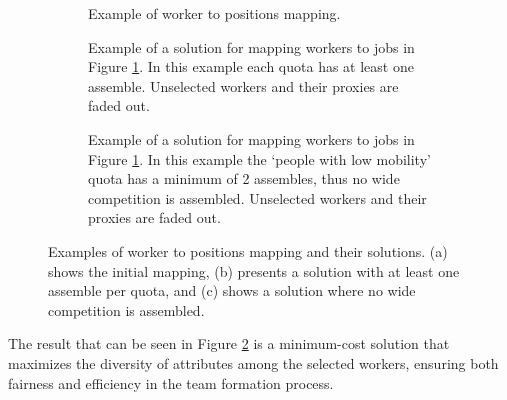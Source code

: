         \begin{figure}[]
            \centering
            \begin{subfigure}[t]{0.8\textwidth}
                \centering
                
                \caption{Example of worker to positions mapping.}
                \label{fig:workers_jobs_unsolved}
            \end{subfigure}
            \vspace{1em}
            \begin{subfigure}[t]{0.8\textwidth}
                \centering
                
                \caption[Example of a solution for mapping workers to jobs in Figure \ref{fig:workers_jobs_unsolved}.]{Example of a solution for mapping workers to jobs in Figure \ref{fig:workers_jobs_unsolved}. In this example each quota has at least one assemble. Unselected workers and their proxies are faded out.}
                \label{fig:workers_jobs_solved}
            \end{subfigure}
            \vspace{1em}
            \begin{subfigure}[t]{0.8\textwidth}
                \centering
                
                \caption[Example of a solution for mapping workers to jobs in Figure \ref{fig:workers_jobs_unsolved}.]{Example of a solution for mapping workers to jobs in Figure \ref{fig:workers_jobs_unsolved}. In this example the `people with low mobility' quota has a minimum of 2 assembles, thus no wide competition is assembled. Unselected workers and their proxies are faded out.}
                \label{fig:workers_jobs_solved_no_wc}
            \end{subfigure}
            \caption{Examples of worker to positions mapping and their solutions. (a) shows the initial mapping, (b) presents a solution with at least one assemble per quota, and (c) shows a solution where no wide competition is assembled.}
            \label{fig:workers_jobs_example}
        \end{figure}
        
         
        The result that can be seen in Figure {\ref{fig:workers_jobs_solved}} is a minimum-cost solution that maximizes the diversity of attributes among the selected workers, ensuring both fairness and efficiency in the team formation process. 
        
